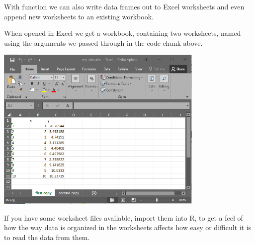 \documentclass[krantz2]{krantz}\usepackage{knitr}%
\begin{document}
With function  we can also write data frames out to Excel worksheets and even append new worksheets to an existing workbook.
\begin{knitrout}\footnotesize
{}\color{fgcolor}\begin{kframe}
\begin{alltt}
\hlstd{(}\hlstd{)}
 \hlkwb{<-} \hlstd{(} \hlstd{=} \hlopt{:}\hlstd{,}  \hlstd{=} \hlopt{:} \hlopt{+} \hlstd{(}\hlstd{))}
  \hlstd{=} \hlstd{,}  \hlstd{=} \hlstd{)}
  \hlstd{=} \hlstd{,}  \hlstd{=} \hlstd{,}  \hlstd{=} \hlstd{)}
\end{alltt}
\end{kframe}
\end{knitrout}

When opened in Excel we get a workbook, containing two worksheets, named using the arguments we passed through  in the code chunk above.
\begin{center}
\includegraphics[width=0.75\textwidth]{figures/my-data-xlsx.png}
\end{center}

\begin{playground}
If you have some worksheet files available, import them into R, to get a feel of how the way data is organized in the worksheets affects how easy or difficult it is to read the data from them.
\end{playground}
\end{document}
